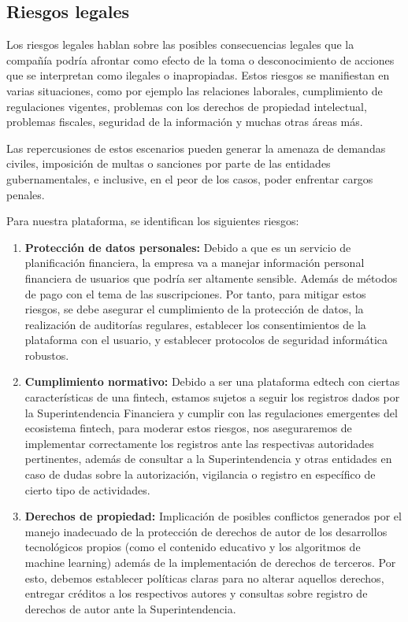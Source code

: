 \subsection*{Riesgos legales}

Los riesgos legales hablan sobre las posibles consecuencias legales que la compañía podría afrontar como efecto de la toma o desconocimiento de acciones que se interpretan como ilegales o inapropiadas. Estos riesgos se manifiestan en varias situaciones, como por ejemplo las relaciones laborales, cumplimiento de regulaciones vigentes, problemas con los derechos de propiedad intelectual, problemas fiscales, seguridad de la información y muchas otras áreas más.

Las repercusiones de estos escenarios pueden generar la amenaza de demandas civiles, imposición de multas o sanciones por parte de las entidades gubernamentales, e inclusive, en el peor de los casos, poder enfrentar cargos penales. 

Para nuestra plataforma, se identifican los siguientes riesgos:

\begin{enumerate}
	\item \textbf{Protección de datos personales:} Debido a que es un servicio de planificación financiera, la empresa va a manejar información personal financiera de usuarios que podría ser altamente sensible. Además de métodos de pago con el tema de las suscripciones. Por tanto, para mitigar estos riesgos, se debe asegurar el cumplimiento de la protección de datos, la realización de auditorías regulares, establecer los consentimientos de la plataforma con el usuario, y establecer protocolos de seguridad informática robustos.
	
	\item \textbf{Cumplimiento normativo:} Debido a ser una plataforma edtech con ciertas características de una fintech, estamos sujetos a seguir los registros dados por la Superintendencia Financiera y cumplir con las regulaciones emergentes del ecosistema fintech, para moderar estos riesgos, nos aseguraremos de implementar correctamente los registros ante las respectivas autoridades pertinentes, además de consultar a la Superintendencia y otras entidades en caso de dudas sobre la autorización, vigilancia o registro en específico de cierto tipo de actividades.
	
	\item \textbf{Derechos de propiedad:} Implicación de posibles conflictos generados por el manejo inadecuado de la protección de derechos de autor de los desarrollos tecnológicos propios (como el contenido educativo y los algoritmos de machine learning) además de la implementación de derechos de terceros. Por esto, debemos establecer políticas claras para no alterar aquellos derechos, entregar créditos a los respectivos autores y consultas sobre registro de derechos de autor ante la Superintendencia.
\end{enumerate}
